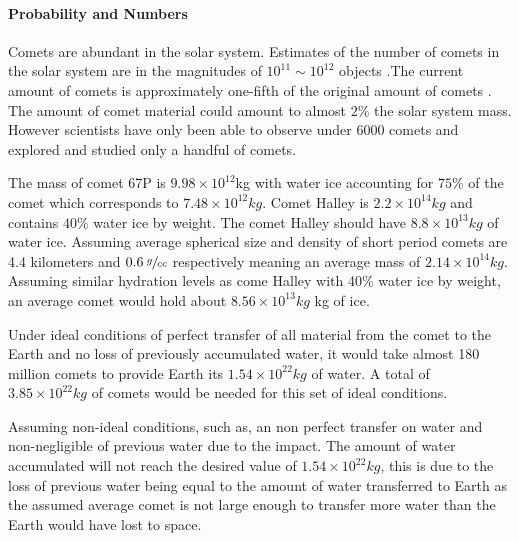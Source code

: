 \newpage
\paragraph{Probability and Numbers}
Comets are abundant in the solar system. Estimates of the number of comets in the solar system are in the magnitudes of \(10^{11}\sim 10^{12}\) objects \cite{Comet_Num}.The current amount of comets is approximately one-fifth of the original amount of comets \cite{Comet_AvgSz}. The amount of comet material could amount to almost \(2\%\) \cite{Comet_AvgSz} the solar system mass. However scientists have only been able to observe under \(6000\) \cite{observed_objects} comets and explored and studied only a handful of comets.


The mass of comet 67P is \(9.98 \times 10^{12}\)kg \cite{67P_Mass} with water ice accounting for \(75\%\) \cite{67P_Water} of the comet which corresponds to \(7.48 \times 10^{12} kg\).
Comet Halley is \(2.2 \times 10^{14}kg\) \cite{Cevolani1987} and contains \(40\% \) water ice \cite{Comet_Yeomans} by weight. The comet Halley should have \(8.8 \times 10^{13} kg\) of water ice.
Assuming average spherical size and density of short period comets are 4.4 kilometers \cite{Comet_AvgSz} and \(0.6 \: \sfrac{g}{cc}\) \cite{Britt2006SmallBD} respectively meaning an average mass of \(2.14 \times 10^{14}kg\). Assuming similar hydration levels as come Halley with 40\% water ice by weight, an average comet would hold about \(8.56 \times 10^{13}kg\) kg of ice.

Under ideal conditions of perfect transfer of all material from the comet to the Earth and no loss of previously accumulated water, it would take almost 180 million comets to provide Earth its \(1.54\times 10^{22} kg\) of water. A total of \(3.85\times 10^{22} kg\) of comets would be needed for this set of ideal conditions.

Assuming non-ideal conditions, such as, an non perfect transfer on water and non-negligible of previous water  due to the impact. The amount of water accumulated will not reach the desired value of \(1.54\times 10^{22} kg\), this is due to the loss of previous water being equal to the amount of water transferred to Earth as the assumed average comet is not large enough to transfer more water than the Earth would have lost to space.

